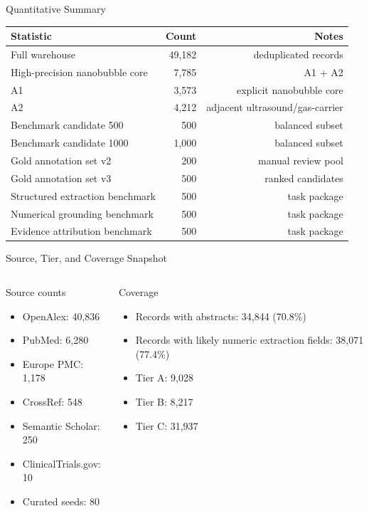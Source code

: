 \documentclass[aspectratio=169]{beamer}
\begin{document}
\begin{frame}{Quantitative Summary}
\begin{table}
\centering
\small
\begin{tabular}{lrr}
\toprule
Statistic & Count & Notes \\
\midrule
Full warehouse & 49,182 & deduplicated records \\
High-precision nanobubble core & 7,785 & A1 + A2 \\
A1 & 3,573 & explicit nanobubble core \\
A2 & 4,212 & adjacent ultrasound/gas-carrier \\
Benchmark candidate 500 & 500 & balanced subset \\
Benchmark candidate 1000 & 1,000 & balanced subset \\
Gold annotation set v2 & 200 & manual review pool \\
Gold annotation set v3 & 500 & ranked candidates \\
Structured extraction benchmark & 500 & task package \\
Numerical grounding benchmark & 500 & task package \\
Evidence attribution benchmark & 500 & task package \\
\bottomrule
\end{tabular}
\end{table}
\end{frame}

\begin{frame}{Source, Tier, and Coverage Snapshot}
\begin{columns}[T,onlytextwidth]
\begin{block}{Source counts}
\begin{itemize}
    \item OpenAlex: 40,836
    \item PubMed: 6,280
    \item Europe PMC: 1,178
    \item CrossRef: 548
    \item Semantic Scholar: 250
    \item ClinicalTrials.gov: 10
    \item Curated seeds: 80
\end{itemize}
\end{block}

\begin{block}{Coverage}
\begin{itemize}
    \item Records with abstracts: 34,844 (70.8\%)
    \item Records with likely numeric extraction fields: 38,071 (77.4\%)
    \item Tier A: 9,028
    \item Tier B: 8,217
    \item Tier C: 31,937
\end{itemize}
\end{block}
\end{columns}
\end{frame}
\end{document}
